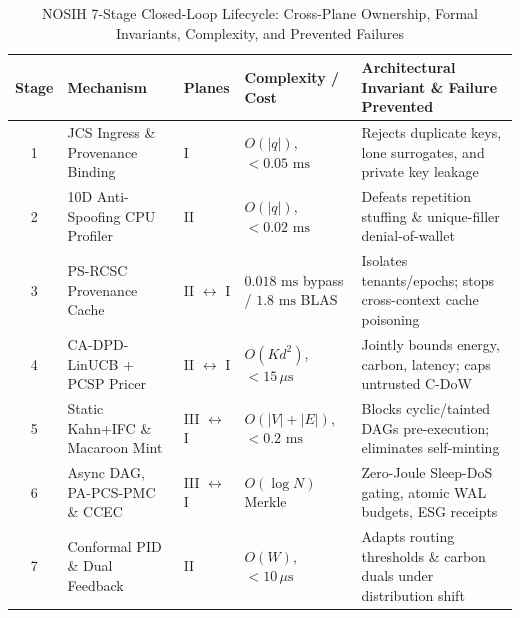 \documentclass[10pt,twocolumn,letterpaper]{article}
\begin{document}
\begin{table}[!t]
\centering
\caption{NOSIH 7-Stage Closed-Loop Lifecycle: Cross-Plane Ownership, Formal Invariants, Complexity, and Prevented Failures}
\label{tab:lifecycle}
\scriptsize
\begin{tabularx}{\textwidth}{clllX}
\toprule
\textbf{Stage} & \textbf{Mechanism} & \textbf{Planes} & \textbf{Complexity / Cost} & \textbf{Architectural Invariant \& Failure Prevented} \\
\midrule
1 & JCS Ingress \& Provenance Binding & I & $O(|q|)$, $<0.05\text{ ms}$ & Rejects duplicate keys, lone surrogates, and private key leakage \\
2 & 10D Anti-Spoofing CPU Profiler & II & $O(|q|)$, $<0.02\text{ ms}$ & Defeats repetition stuffing \& unique-filler denial-of-wallet \\
3 & PS-RCSC Provenance Cache & II $\leftrightarrow$ I & $0.018\text{ ms}$ bypass / $1.8\text{ ms}$ BLAS & Isolates tenants/epochs; stops cross-context cache poisoning \\
4 & CA-DPD-LinUCB + PCSP Pricer & II $\leftrightarrow$ I & $O(Kd^2)$, $<15\,\mu\text{s}$ & Jointly bounds energy, carbon, latency; caps untrusted C-DoW \\
5 & Static Kahn+IFC \& Macaroon Mint & III $\leftrightarrow$ I & $O(|V|+|E|)$, $<0.2\text{ ms}$ & Blocks cyclic/tainted DAGs pre-execution; eliminates self-minting \\
6 & Async DAG, PA-PCS-PMC \& CCEC & III $\leftrightarrow$ I & $O(\log N)$ Merkle & Zero-Joule Sleep-DoS gating, atomic WAL budgets, ESG receipts \\
7 & Conformal PID \& Dual Feedback & II & $O(W)$, $<10\,\mu\text{s}$ & Adapts routing thresholds \& carbon duals under distribution shift \\
\bottomrule
\end{tabularx}
\end{table}
\end{document}
